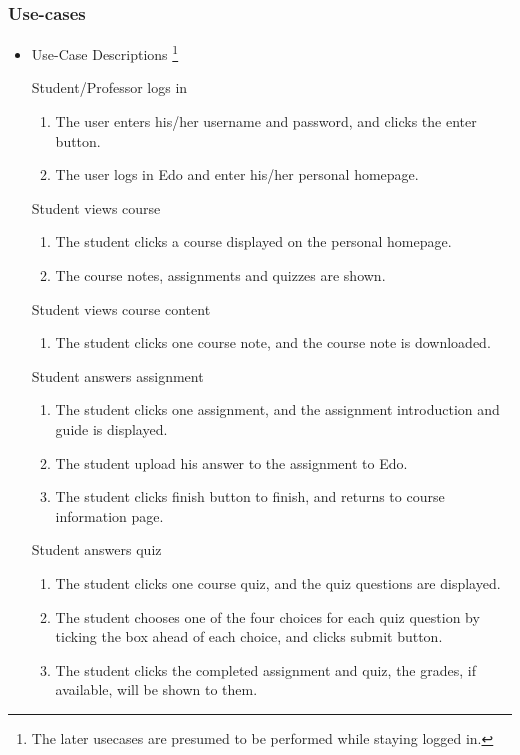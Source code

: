 \documentclass[paper=a4, fontsize=11pt]{scrartcl}
\numberwithin{equation}{section}		%
\numberwithin{figure}{section}			%
\numberwithin{table}{section}				%
\begin{document}
\subsubsection{Use-cases}
\begin{itemize}
	\item Use-Case Descriptions \footnote{The later usecases are presumed to be performed while staying logged in.}
	\par Student/Professor logs in
	\begin{enumerate}
		\item The user enters his/her username and password, and clicks the enter button.
		\item The user logs in Edo and enter his/her personal homepage.
	\end{enumerate}
	\par Student views course
	\begin{enumerate}
		\item The student clicks a course displayed on the personal homepage.
		\item The course notes, assignments and quizzes are shown.
	\end{enumerate}
	\par Student views course content
	\begin{enumerate}
		\item The student clicks one course note, and the course note is downloaded.
	\end{enumerate}
	\par Student answers assignment
	\begin{enumerate}
		\item The student clicks one assignment, and the assignment introduction and guide is displayed.
		\item The student upload his answer to the assignment to Edo.
		\item The student clicks finish button to finish, and returns to course information page.
	\end{enumerate}
	\par Student answers quiz
	\begin{enumerate}
		\item The student clicks one course quiz, and the quiz questions are displayed.
		\item The student chooses one of the four choices for each quiz question by ticking the box ahead of each choice, and clicks submit button.
		\item The student clicks the completed assignment and quiz, the grades, if available, will be shown to them. 

\end{enumerate}
\end{itemize}
\end{document}
